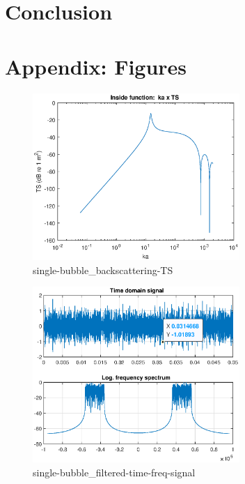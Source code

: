 \documentclass[11pt]{article}
\begin{document}
\section{Conclusion}

%
%
%
%


\printbibliography
\section*{Appendix: Figures}
\begin{figure} [H] 
    \centering
    \includegraphics[width=0.7\textwidth]{figures/single-bubble_backscattering-TS.eps}
    \caption{single-bubble_backscattering-TS}
    \label{fig:single-bubble_backscattering-TS}
\end{figure}

\begin{figure} [H]
    \centering
    \includegraphics[width=0.7\textwidth]{figures/single-bubble_filtered-time-freq-signal.eps}
    \caption{single-bubble_filtered-time-freq-signal}
    \label{fig:single-bubble_filtered-time-freq-signal}
\end{figure}
\end{document}
